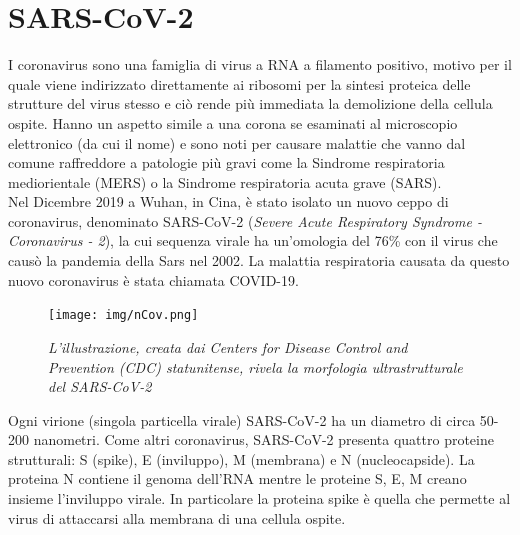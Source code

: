 \documentclass[a4paper,10pt]{article}
\begin{document}
\tableofcontents

\newpage

\section{SARS-CoV-2}
I coronavirus sono una famiglia di virus a RNA a filamento positivo, motivo per il quale viene indirizzato direttamente ai ribosomi per la sintesi proteica delle strutture del virus stesso e ciò rende più immediata la demolizione della cellula ospite. Hanno un aspetto simile a una corona se esaminati al microscopio elettronico (da cui il nome) e sono noti per causare malattie che vanno dal comune raffreddore a patologie più gravi come la Sindrome respiratoria mediorientale (MERS) o la Sindrome respiratoria acuta grave (SARS). \\

Nel Dicembre 2019 a Wuhan, in Cina, è stato isolato un nuovo ceppo di coronavirus, denominato SARS-CoV-2 (\textit{Severe Acute Respiratory Syndrome - Coronavirus - 2}), la cui sequenza virale ha un'omologia del 76\% con il virus che causò la pandemia della Sars nel 2002. La malattia respiratoria causata da questo nuovo coronavirus è stata chiamata COVID-19.

\begin{figure}[H]
\centering
\texttt{[image: img/nCov.png]}
\caption{\textit{L’illustrazione, creata dai Centers for Disease Control and Prevention (CDC) statunitense, rivela la morfologia ultrastrutturale del SARS-CoV-2}}
\label{fig:1}
\end{figure}

Ogni virione (singola particella virale) SARS-CoV-2 ha un diametro di circa 50-200 nanometri. Come altri coronavirus, SARS-CoV-2 presenta quattro proteine strutturali: S (spike), E (inviluppo), M (membrana) e N (nucleocapside). La proteina N contiene il genoma dell'RNA mentre le proteine S, E, M creano insieme l'inviluppo virale. In particolare la proteina spike è quella che permette al virus di attaccarsi alla membrana di una cellula ospite.\\
\end{document}
